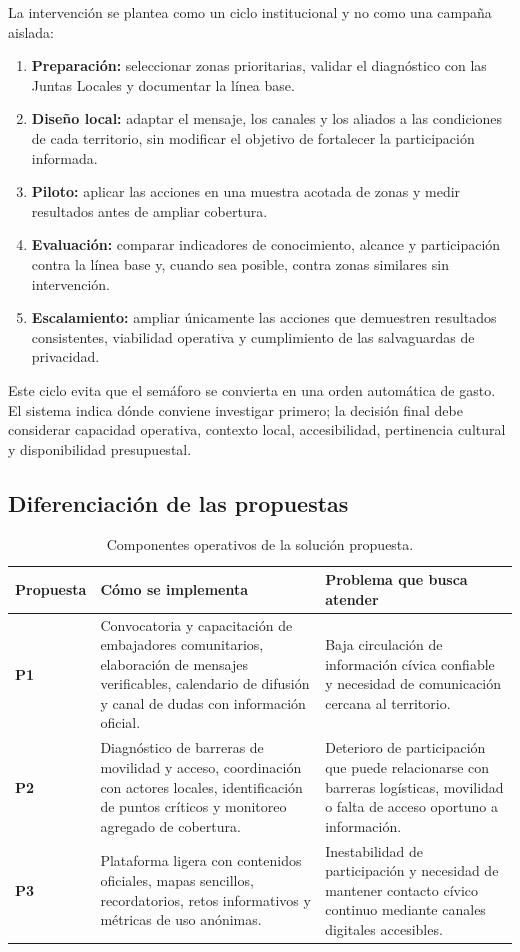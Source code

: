 \documentclass[11pt,a4paper]{article}
\begin{document}
La intervención se plantea como un ciclo institucional y no como una campaña aislada:
\begin{enumerate}
    \item \textbf{Preparación:} seleccionar zonas prioritarias, validar el diagnóstico con las Juntas Locales y documentar la línea base.
    \item \textbf{Diseño local:} adaptar el mensaje, los canales y los aliados a las condiciones de cada territorio, sin modificar el objetivo de fortalecer la participación informada.
    \item \textbf{Piloto:} aplicar las acciones en una muestra acotada de zonas y medir resultados antes de ampliar cobertura.
    \item \textbf{Evaluación:} comparar indicadores de conocimiento, alcance y participación contra la línea base y, cuando sea posible, contra zonas similares sin intervención.
    \item \textbf{Escalamiento:} ampliar únicamente las acciones que demuestren resultados consistentes, viabilidad operativa y cumplimiento de las salvaguardas de privacidad.
\end{enumerate}

Este ciclo evita que el semáforo se convierta en una orden automática de gasto. El sistema indica dónde conviene investigar primero; la decisión final debe considerar capacidad operativa, contexto local, accesibilidad, pertinencia cultural y disponibilidad presupuestal.

\subsection{Diferenciación de las propuestas}

\begin{table}[H]
\centering
\caption{Componentes operativos de la solución propuesta.}
\label{tab:componentes_intervencion}
\begin{tabularx}{\textwidth}{>{\bfseries}p{}p{}X}
\toprule
\textbf{Propuesta} & \textbf{Cómo se implementa} & \textbf{Problema que busca atender}\\
\midrule
P1 & Convocatoria y capacitación de embajadores comunitarios, elaboración de mensajes verificables, calendario de difusión y canal de dudas con información oficial. & Baja circulación de información cívica confiable y necesidad de comunicación cercana al territorio.\\
P2 & Diagnóstico de barreras de movilidad y acceso, coordinación con actores locales, identificación de puntos críticos y monitoreo agregado de cobertura. & Deterioro de participación que puede relacionarse con barreras logísticas, movilidad o falta de acceso oportuno a información.\\
P3 & Plataforma ligera con contenidos oficiales, mapas sencillos, recordatorios, retos informativos y métricas de uso anónimas. & Inestabilidad de participación y necesidad de mantener contacto cívico continuo mediante canales digitales accesibles.\\
\bottomrule
\end{tabularx}
\end{table}
\end{document}

